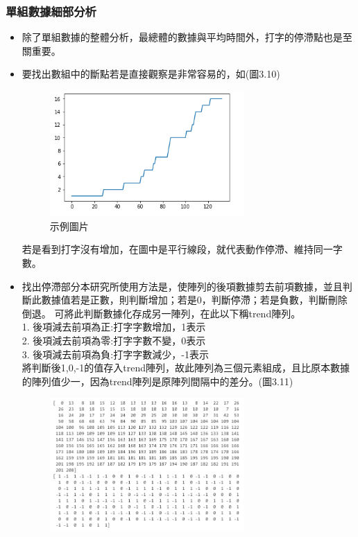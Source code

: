 \subsubsection{單組數據細部分析}
\begin{itemize}
	\item 除了單組數據的整體分析，最總體的數據與平均時間外，打字的停滯點也是至關重要。
	\item 要找出數組中的斷點若是直接觀察是非常容易的，如(圖3.10)
		\begin{figure}[H] 
		\centering 
		\includegraphics[width=0.7\textwidth]{3_10.png} 
		\caption{示例圖片} 
		\label{Fig.3.10} 
	\end{figure}
	若是看到打字沒有增加，在圖中是平行線段，就代表動作停滯、維持同一字數。
	\item 找出停滯部分本研究所使用方法是，使陣列的後項數據剪去前項數據，並且判斷此數據值若是正數，則判斷增加；若是0，判斷停滯；若是負數，判斷刪除倒退。
	可將此判斷數據化存成另一陣列，在此以下稱trend陣列。\\
	1. 後項減去前項為正:打字字數增加，1表示\\
	2. 後項減去前項為零:打字字數不變，0表示\\
	3. 後項減去前項為負:打字字數減少，-1表示\\
	將判斷後1,0,-1的值存入trend陣列，故此陣列為三個元素組成，且比原本數據的陣列值少一，因為trend陣列是原陣列間隔中的差分。(圖3.11)
		\begin{figure}[H] 
		\centering 
		\includegraphics[width=0.7\textwidth]{3_11.png} 

\end{figure}
\end{itemize}
